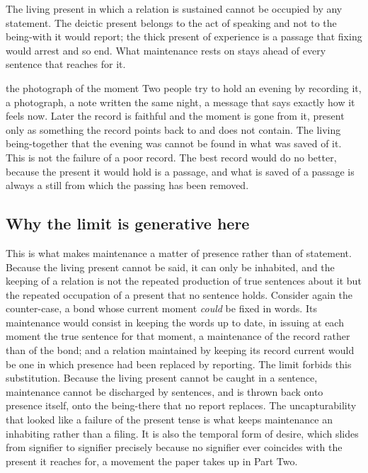 \begin{claim}
The living present in which a relation is sustained cannot be occupied by any statement. The deictic present belongs to the act of speaking and not to the being-with it would report; the thick present of experience is a passage that fixing would arrest and so end. What maintenance rests on stays ahead of every sentence that reaches for it.
\end{claim}

\begin{casebox}{the photograph of the moment}
Two people try to hold an evening by recording it, a photograph, a note written the same night, a message that says exactly how it feels now. Later the record is faithful and the moment is gone from it, present only as something the record points back to and does not contain. The living being-together that the evening was cannot be found in what was saved of it. This is not the failure of a poor record. The best record would do no better, because the present it would hold is a passage, and what is saved of a passage is always a still from which the passing has been removed.
\end{casebox}

\subsection*{Why the limit is generative here}

This is what makes maintenance a matter of presence rather than of statement. Because the living present cannot be said, it can only be inhabited, and the keeping of a relation is not the repeated production of true sentences about it but the repeated occupation of a present that no sentence holds. Consider again the counter-case, a bond whose current moment \emph{could} be fixed in words. Its maintenance would consist in keeping the words up to date, in issuing at each moment the true sentence for that moment, a maintenance of the record rather than of the bond; and a relation maintained by keeping its record current would be one in which presence had been replaced by reporting. The limit forbids this substitution. Because the living present cannot be caught in a sentence, maintenance cannot be discharged by sentences, and is thrown back onto presence itself, onto the being-there that no report replaces. The uncapturability that looked like a failure of the present tense is what keeps maintenance an inhabiting rather than a filing. It is also the temporal form of desire, which slides from signifier to signifier precisely because no signifier ever coincides with the present it reaches for, a movement the paper takes up in Part Two.
